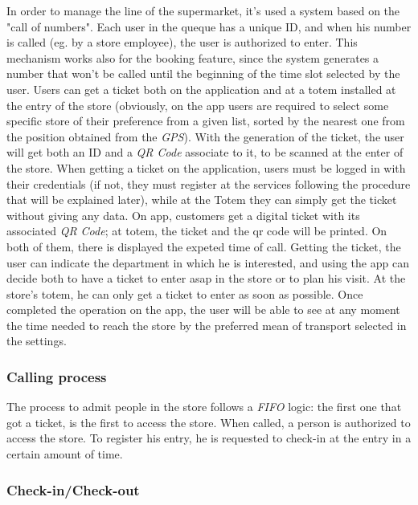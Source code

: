 \documentclass{article}
\begin{document}
		In order to manage the line of the supermarket, it's used a system based on the "call of numbers". Each user in the queque has a unique ID, and when his number is called (eg. by a store employee), the user is authorized to enter. This mechanism works also for the booking feature, since the system generates a number that won't be called until the beginning of the time slot selected by the user. Users can get a ticket both on the application and at a totem installed at the entry of the store (obviously, on the app users are required to select some specific store of their preference from a given list, sorted by the nearest one from the position obtained from the \emph{GPS}). With the generation of the ticket, the user will get both an ID and a \emph{QR Code} associate to it, to be scanned at the enter of the store. When getting a ticket on the application, users must be logged in with their credentials (if not, they must register at the services following the procedure that will be explained later), while at the Totem they can simply get the ticket without giving any data. On app, customers get a digital ticket with its associated \emph{QR Code}; at totem, the ticket and the qr code will be printed. On both of them, there is displayed the expeted time of call. Getting the ticket, the user can indicate the department in which he is interested, and using the app can decide both to have a ticket to enter asap in the store or to plan his visit. At the store's totem, he can only get a ticket to enter as soon as possible. Once completed the operation on the app, the user will be able to see at any moment the time needed to reach the store by the preferred mean of transport selected in the settings.
		
		\subsubsection{Calling process}
		
		The process to admit people in the store follows a \emph{FIFO} logic: the first one that got a ticket, is the first to access the store. When called, a person is authorized to access the store. To register his entry, he is requested to check-in at the entry in a certain amount of time. \\
		
		\subsubsection{Check-in/Check-out}
		
\end{document}
